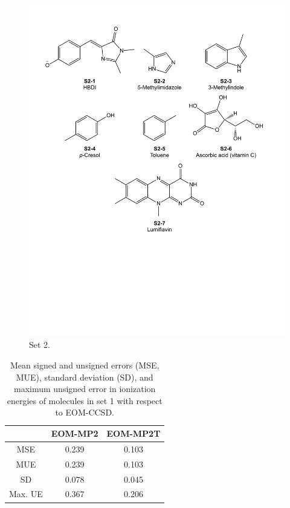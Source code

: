 \documentclass[12pt,nofootinbib]{revtex4}
\begin{document}
\begin{figure}[!tbh]
	\includegraphics[width=15cm]{./figures/set2.pdf}
	\caption{Set 2.
		\protect\label{fig:set2}}
\end{figure}

\clearpage
\begin{table}[htbp]
	\centering
	\caption{Mean signed and unsigned errors (MSE, MUE), standard deviation (SD), and maximum unsigned error in ionization energies of molecules in set 1 with respect to EOM-CCSD.}
	\begin{tabular}{ccc}
		\toprule
		& EOM-MP2 & EOM-MP2T \\
		\hline
		MSE   & 0.239 & 0.103 \\
		MUE   & 0.239 & 0.103 \\
		SD    & 0.078 & 0.045 \\
		Max. UE & 0.367 & 0.206 \\
		\hline
	\end{tabular}%
	\label{tab:set1_ip}%
\end{table}%
\end{document}
